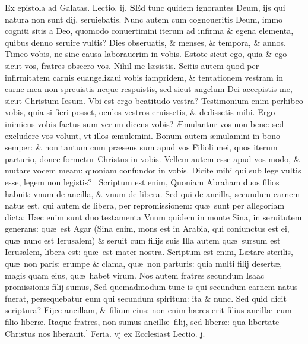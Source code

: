 \documentclass[a5paper,10pt]{book}
\def\leftmarginnote{%
	\lrmarginnote{\hskip -\marginparsep \hskip -6.5em}}
\def\rightmarginnote{%
	\lrmarginnote{\hskip\columnwidth \hskip -1em}}
\def\ae{æ}
\def\AE{Æ}
\begin{document}
\begin{multicols*}{2}
\newline \color{red} Ex epistola ad Galatas. \hfill Lectio. ij. \color{black}
\vspace{-.25em}
\lettrine[lines=2]{\bfseries S}{}Ed\rightmarginnote{ca. 4.} tunc quidem ignorantes Deum, ijs qui natura non sunt dij, seruiebatis. Nunc autem cum
cognoueritis Deum, immo cogniti sitis a Deo, quomodo conuertimini iterum ad infirma \& egena elementa, quibus denuo seruire vultis? Dies obseruatis, \& menses, \& tempora, \& annos.
Timeo vobis, ne sine causa laborauerim in vobis. Estote sicut ego, quia \& ego sicut vos, fratres obsecro vos.
Nihil me l\ae sistis. Scitis autem quod per infirmitatem carnis euangelizaui vobis iampridem, \& tentationem vestram in carne mea non spreuistis neque respuistis, sed sicut angelum Dei accepistis me, sicut Christum Iesum.
Vbi est ergo beatitudo vestra? Testimonium enim perhibeo vobis, quia si fieri posset, oculos vestros eruissetis, \& dedissetis mihi.
Ergo inimicus vobis factus sum verum dicens vobis? \AE mulantur vos non bene: sed excludere vos volunt, vt illos \ae mulemini.
Bonum autem \ae mulamini in bono semper: \& non tantum cum pr\ae sens sum apud vos Filioli mei, quos iterum parturio, donec formetur Christus in vobis. Vellem autem esse apud vos modo, \& mutare vocem meam: quoniam confundor in vobis.
Dicite mihi qui sub lege vultis esse, legem non legistis? \textdagger \ 
Scriptum\leftmarginnote{\begin{flushright}C\end{flushright}} est enim, Quoniam Abraham duos filios habuit: vnum de ancilla, \& vnum de libera.
Sed qui de ancilla, secundum carnem natus est, qui autem de libera, per repromissionem: qu\ae \ sunt per allegoriam dicta: H\ae c enim sunt duo testamenta Vnum quidem in monte Sina, in seruitutem generans: qu\ae \ est Agar (Sina enim, mons est in Arabia, qui coniunctus est ei, qu\ae \ nunc est Ierusalem) \& seruit cum filijs suis
Illa autem qu\ae \ sursum est Ierusalem, libera est: qu\ae \ est mater nostra. Scriptum est enim, L\ae tare sterilis, qu\ae \ non paris: erumpe \& clama, qu\ae \ non parturis: quia multi filij desert\ae , magis quam eius, qu\ae \ habet virum.
Nos autem fratres secundum Isaac promissionis filij sumus, Sed quemadmodum tunc is qui secundum carnem natus fuerat, persequebatur eum qui secundum spiritum: ita \& nunc.
Sed quid dicit scriptura? Eijce ancillam, \& filium eius: non enim h\ae res erit filius ancill\ae \ cum filio liber\ae .
Itaque fratres, non sumus ancill\ae \ filij, sed liber\ae : qua libertate Christus nos liberauit.]
\newline \textswab{C} \color{red} \hypertarget{FRI-PRIMA-VAGAN}{Feria. vj} ex Ecclesiast Lectio. j. \color{black}

\end{multicols*}
\end{document}
